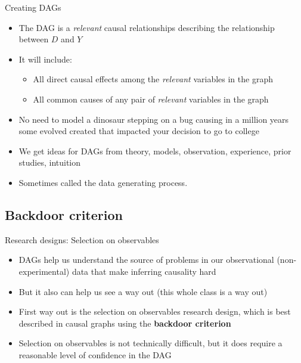 \documentclass{beamer}
\begin{document}
\begin{frame}{Creating DAGs}

  \begin{itemize}
    \item The DAG is a \emph{relevant} causal relationships describing the relationship between $D$ and $Y$
    \item It will include:
          \begin{itemize}
            \item All direct causal effects among the \emph{relevant} variables in the graph
            \item All common causes of any pair of \emph{relevant} variables in the graph
          \end{itemize}
    \item No need to model a dinosaur stepping on a bug causing in a million years some evolved created that impacted your decision to go to college
    \item We get ideas for DAGs from theory, models, observation, experience, prior studies, intuition
    \item Sometimes called the data generating process.
  \end{itemize}

\end{frame}



\subsection{Backdoor criterion}

\begin{frame}{Research designs: Selection on observables}

  \begin{itemize}

    \item DAGs help us understand the source of problems in our observational (non-experimental) data that make inferring causality hard
    \item But it also can help us see a way out (this whole class is a way out)
    \item First way out is the selection on observables research design, which is best described in causal graphs using the \textbf{backdoor criterion}
    \item Selection on observables is not technically difficult, but it does require a reasonable level of confidence in the DAG
  \end{itemize}

\end{frame}
\end{document}
